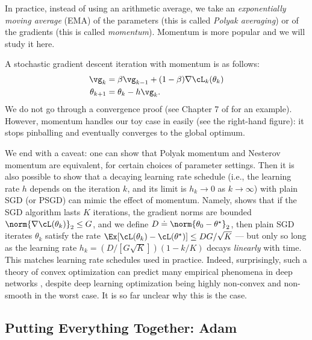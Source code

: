 \documentclass[../../book-main.tex]{subfiles}
\begin{document}
In practice, instead of using an arithmetic average, we take an
\textit{exponentially moving average} (EMA) of the parameters (this
is called \textit{Polyak averaging}) or of the gradients (this is
called \textit{momentum}). Momentum is more popular and we will study it here.

A stochastic gradient descent iteration with momentum is as follows:
\begin{align}
    \vg_{k}
    &= \beta\vg_{k - 1} + (1 - \beta)\nabla \cL_{k}(\theta_{k}) \\
    \theta_{k + 1}
    &= \theta_{k} - h\vg_{k}.
\end{align}
We do not go through a convergence proof (see Chapter 7 of
\cite{garrigos2023handbook} for an example). However, momentum
handles our toy case in  easily (see the
right-hand figure): it stops pinballing and eventually converges to
the global optimum.

We end with a caveat: one can show that Polyak momentum and Nesterov
momentum are equivalent, for certain choices of parameter settings.
Then it is also possible to show that a decaying learning rate
schedule (i.e., the learning rate \(h\) depends on the iteration
\(k\), and its limit is \(h_{k} \to 0\) as \(k \to \infty\)) with
plain SGD (or PSGD) can mimic the effect of momentum. Namely,
\cite{defazio2023optimal} shows that if the SGD algorithm lasts \(K\)
iterations, the gradient norms are bounded \(\norm{\nabla
\cL(\theta_{k})}_{2} \leq G\), and we define \(D \doteq
\norm{\theta_{0} - \theta^{\star}}_{2}\), then plain SGD iterates
\(\theta_{k}\) satisfy the rate \(\Ex[\cL(\theta_{k}) -
\cL(\theta^{\star})] \leq DG/\sqrt{K}\) --- but only so long as the
learning rate \(h_{k} = (D/[G\sqrt{K}])(1 - k/K)\) decays
\textit{linearly} with time. This matches learning rate schedules
used in practice. Indeed, surprisingly, such a theory of convex
optimization can predict many empirical phenomena in deep networks
\cite{schaipp2025surprising}, despite deep learning optimization
being highly non-convex and non-smooth in the worst case. It is so
far unclear why this is the case.

\subsection{Putting Everything Together: Adam}
\end{document}
